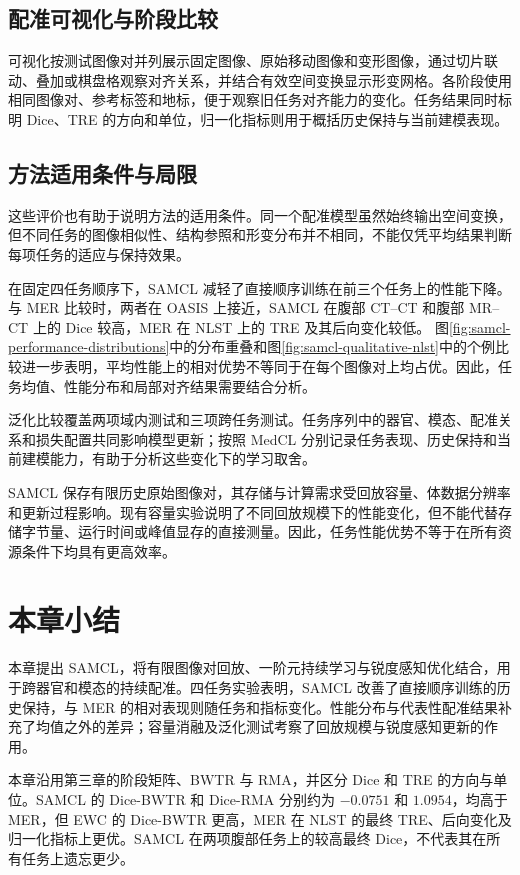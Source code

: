 \subsection{配准可视化与阶段比较}

可视化按测试图像对并列展示固定图像、原始移动图像和变形图像，通过切片联动、叠加或棋盘格观察对齐关系，并结合有效空间变换显示形变网格。各阶段使用相同图像对、参考标签和地标，便于观察旧任务对齐能力的变化。任务结果同时标明 Dice、TRE 的方向和单位，归一化指标则用于概括历史保持与当前建模表现。

\subsection{方法适用条件与局限}
\label{sec:registration-discussion}

这些评价也有助于说明方法的适用条件。同一个配准模型虽然始终输出空间变换，但不同任务的图像相似性、结构参照和形变分布并不相同，不能仅凭平均结果判断每项任务的适应与保持效果。

在固定四任务顺序下，SAMCL 减轻了直接顺序训练在前三个任务上的性能下降。与 MER 比较时，两者在 OASIS 上接近，SAMCL 在腹部 CT--CT 和腹部 MR--CT 上的 Dice 较高，MER 在 NLST 上的 TRE 及其后向变化较低。 图\ref{fig:samcl-performance-distributions}中的分布重叠和图\ref{fig:samcl-qualitative-nlst}中的个例比较进一步表明，平均性能上的相对优势不等同于在每个图像对上均占优。因此，任务均值、性能分布和局部对齐结果需要结合分析。

泛化比较覆盖两项域内测试和三项跨任务测试。任务序列中的器官、模态、配准关系和损失配置共同影响模型更新；按照 MedCL 分别记录任务表现、历史保持和当前建模能力，有助于分析这些变化下的学习取舍。

SAMCL 保存有限历史原始图像对，其存储与计算需求受回放容量、体数据分辨率和更新过程影响。现有容量实验说明了不同回放规模下的性能变化，但不能代替存储字节量、运行时间或峰值显存的直接测量。因此，任务性能优势不等于在所有资源条件下均具有更高效率。

\section{本章小结}
\label{sec:registration-summary}

本章提出 SAMCL，将有限图像对回放、一阶元持续学习与锐度感知优化结合，用于跨器官和模态的持续配准。四任务实验表明，SAMCL 改善了直接顺序训练的历史保持，与 MER 的相对表现则随任务和指标变化。性能分布与代表性配准结果补充了均值之外的差异；容量消融及泛化测试考察了回放规模与锐度感知更新的作用。

本章沿用第三章的阶段矩阵、BWTR 与 RMA，并区分 Dice 和 TRE 的方向与单位。SAMCL 的 Dice-BWTR 和 Dice-RMA 分别约为 $-0.0751$ 和 $1.0954$，均高于 MER，但 EWC 的 Dice-BWTR 更高，MER 在 NLST 的最终 TRE、后向变化及归一化指标上更优。SAMCL 在两项腹部任务上的较高最终 Dice，不代表其在所有任务上遗忘更少。